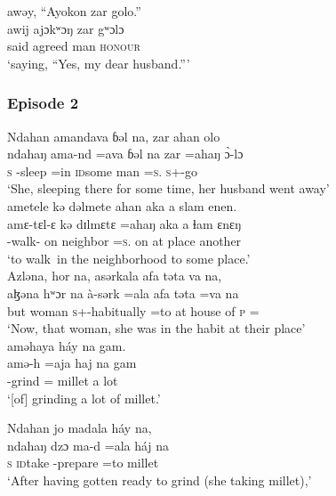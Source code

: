 \ea  awəy,  “Ayokon  zar  golo.”\\
\gll awij    ajɔkʷɔŋ   zar  gʷɔlɔ\\
said   agreed man  \textsc{honour}\\
\glt ‘saying, “Yes, my dear husband.”’
\z 

\subsubsection*{Episode 2}
\ea  Ndahan  amandava  ɓəl  na, zar  ahan  olo\\
\gll ndahaŋ  ama-nd    =ava   ɓəl   na  zar  =ahaŋ      \`ɔ{}-lɔ\\
\textsc{s}         {\DEP}-sleep  =in    \textsc{id}some  {\PSP}  man  =\textsc{s}.{\POSS}  \textsc{s}+{\PFV}-go  \\
\glt ‘She, sleeping there for some time, her husband went away’\\

\medskip
 ametele  kə  dəlmete  ahan  aka  a  slam  enen.\\
\gll amɛ-tɛl-ɛ     kə  dɪlmɛtɛ   =ahaŋ      aka   a  ɬam  ɛnɛŋ\\
{\DEP}-walk-{\CL}  on   neighbor  =\textsc{s}.{\POSS}  on  at place another\\
\glt ‘to walk~in the neighborhood to some place.’ \\
\z
\ea  Azləna,  hor  na,  asərkala  afa  təta  va  na,\\
 \gll aɮəna  hʷɔr   na à-sərk =ala afa təta  =va na\\
 but  woman  {\PSP}  \textsc{s}+{\PFV}-{habitually} =to     {at house of}  \textsc{p}    ={\PRF}  {\PSP}\\
 \glt ‘Now, that woman, she was in the habit at their place’\\
 
 \medskip
  aməhaya  háy  na  gam.\\
  \gll amə-h  =aja      haj        na  gam\\
 {\DEP}-grind  ={\PLU}  millet  {\PSP}    {a lot}\\
 \glt ‘[of] grinding a lot of millet.’ 
 \z
 
 \ea  Ndahan  jo  madala  háy  na,           \\
\gll ndahaŋ    dzɔ      ma-d    =ala      háj  na\\
 \textsc{s}         \textsc{id}take   {\NOM}{}-prepare  =to    millet   {\PSP}\\
 \glt ‘After having gotten ready to grind (she taking millet),’\\
 
